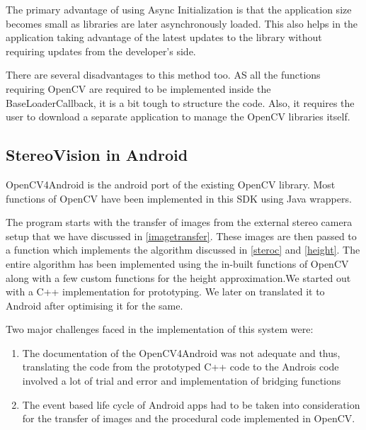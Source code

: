 \documentclass[11pt]{report}
\begin{document}
{{The primary advantage of using Async Initialization is that the application size becomes small as libraries are later asynchronously loaded. This also helps in the application taking advantage of the latest updates to the library without requiring updates from the developer's side.

There are several disadvantages to this method too. AS all the functions requiring OpenCV are required to be implemented inside the BaseLoaderCallback, it is a bit tough to structure the code. Also, it requires the user to download a separate application to manage the OpenCV libraries itself.

\subsection{StereoVision in Android}

OpenCV4Android is the android port of the existing OpenCV library. Most functions of OpenCV have been implemented in this SDK using Java wrappers. 

The program starts with the transfer of images from the external stereo camera setup that we have discussed in \ref{imagetransfer}. These images are then passed to a function which implements the algorithm discussed in \ref{steroc} and \ref{height}. The entire algorithm has been implemented using the in-built functions of OpenCV along with a few custom functions for the height approximation.We started out with a C++ implementation for prototyping. We later on translated it to Android after optimising it for the same.

Two major challenges faced in the implementation of this system were:

\begin{enumerate}
\item The documentation of the OpenCV4Android was not adequate and thus, translating the code from the prototyped C++ code to the Androis code involved a lot of trial and error and implementation of bridging functions

\item The event based life cycle of Android apps had to be taken into consideration for the transfer of images and the procedural code implemented in OpenCV.
\end{enumerate}

}}
\end{document}
